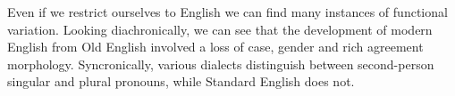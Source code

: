 \documentclass[MilwayThesis]{subfiles}
\begin{document}
Even if we restrict ourselves to English we can find many instances of functional variation.
Looking diachronically, we can see that the development of modern English from Old English involved a loss of case, gender and rich agreement morphology.
Syncronically, various dialects distinguish between second-person singular and plural pronouns, while Standard English does not.

%
%
%
%
\end{document}
